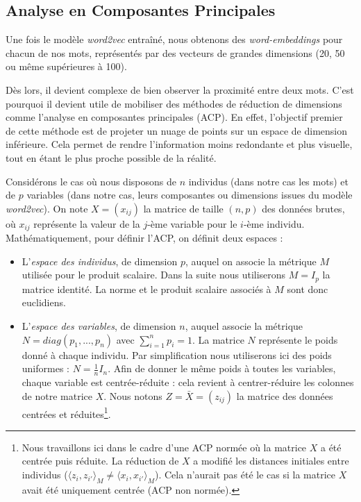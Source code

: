 \documentclass[11pt,french,french]{article}
\let\rmarkdownfootnote\footnote%
\def\footnote{\protect\rmarkdownfootnote}
\begin{document}
\hypertarget{analyse-en-composantes-principales}{%
\subsection{Analyse en Composantes Principales}\label{analyse-en-composantes-principales}}

Une fois le modèle \emph{word2vec} entraîné, nous obtenons des \emph{word-embeddings} pour chacun de nos mots, représentés par des vecteurs de grandes dimensions (20, 50 ou même supérieures à 100).

Dès lors, il devient complexe de bien observer la proximité entre deux mots.
C'est pourquoi il devient utile de mobiliser des méthodes de réduction de dimensions comme l'analyse en composantes principales (ACP).
En effet, l'objectif premier de cette méthode est de projeter un nuage de points sur un espace de dimension inférieure.
Cela permet de rendre l'information moins redondante et plus visuelle, tout en étant le plus proche possible de la réalité.

Considérons le cas où nous disposons de \(n\) individus (dans notre cas les mots) et de \(p\) variables (dans notre cas, leurs composantes ou dimensions issues du modèle \emph{word2vec}).
On note \(X = (x_{ij})\) la matrice de taille \((n,p)\) des données brutes, où \(x_{ij}\) représente la valeur de la \(j\)-ème variable pour le \(i\)-ème individu. Mathématiquement, pour définir l'ACP, on définit deux espaces :

\begin{itemize}
\item
  L'\emph{espace des individus}, de dimension \(p\), auquel on associe la métrique \(M\) utilisée pour le produit scalaire. Dans la suite nous utiliserons \(M =I_p\) la matrice identité. La norme et le produit scalaire associés à \(M\) sont donc euclidiens.
\item
  L'\emph{espace des variables}, de dimension \(n\), auquel associe la métrique \(N=diag(p_1,...,p_n)\) avec \(\sum_{i=1}^np_i=1\). La matrice \(N\) représente le poids donné à chaque individu. Par simplification nous utiliserons ici des poids uniformes : \(N=\frac{1}{n}I_n\). Afin de donner le même poids à toutes les variables, chaque variable est centrée-réduite : cela revient à centrer-réduire les colonnes de notre matrice \(X\). Nous notons \(Z =\bar X= (z_{ij})\) la matrice des données centrées et réduites\footnote{Nous travaillons ici dans le cadre d'une ACP normée où la matrice \(X\) a été centrée puis réduite. La réduction de \(X\) a modifié les distances initiales entre individus (\(\langle z_i,z_{i'}\rangle_M \neq \langle x_i,x_{i'}\rangle_M\)). Cela n'aurait pas été le cas si la matrice \(X\) avait été uniquement centrée (ACP non normée).}.
\end{itemize}
\end{document}
